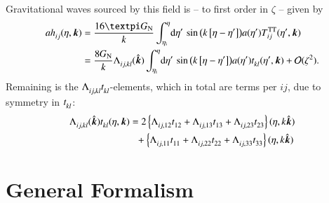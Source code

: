 \begin{draft}
    Gravitational waves sourced by this field is -- to first order in $\zeta$ -- given by
    \begin{equation}
    \begin{split}
        a\tensor{h}{_{ij}}(\eta, \vec{k}) &= \frac{16\ppi G\ped{N}}{k} \int_{\eta\ped{i}}^{\eta} \! \diff \eta'\, \sin{\pclosed{k\bclosed{\eta-\eta'}}} a(\eta')  \tensor*{T}{^{\mathrm{TT}}_{ij}}(\eta', \vec{k}) \\
        &= \frac{8 G\ped{N}}{k} \tensor{\Lambda}{_{ij,kl}}(\hat{\vec{k}}) \int_{\eta\ped{i}}^{\eta} \! \diff \eta'\, \sin{\pclosed{k\bclosed{\eta-\eta'}}} a(\eta') t\loind{kl}(\eta', \vec{k}) + \BigO{\zeta^2}.
    \end{split}
    \end{equation}
    Remaining is the $\Lambda\loind{ij,kl}t\loind{kl}$-elements, which in total are  terms per $ij$, due to symmetry in $t\loind{kl}$: %
    \begin{equation}
    \begin{split}
        \Lambda\loind{ij,kl} (\hat{\vec{k}}) t\loind{kl} (\eta,\vec{k}) &=2\cclosed{%
            \Lambda\loind{ij,12} t\loind{12} + \Lambda\loind{ij,13} t\loind{13} + \Lambda\loind{ij,23} t\loind{23}} (\eta, k\hat{\vec{k}}) \\
            &\phantom{=}+ \cclosed{
                \Lambda\loind{ij,11} t\loind{11} + \Lambda\loind{ij,22} t\loind{22} + \Lambda\loind{ij,33} t\loind{33}
            }(\eta, k\hat{\vec{k}})
    \end{split}
    \end{equation}

    

\end{draft}



\newpage

\section{General Formalism}






